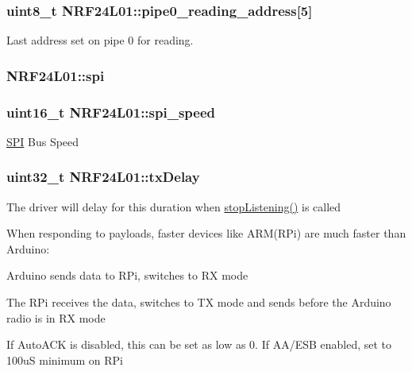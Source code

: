 \subsubsection[{\texorpdfstring{pipe0\+\_\+reading\+\_\+address}{pipe0_reading_address}}]{\setlength{\rightskip}{0pt plus 5cm}uint8\+\_\+t N\+R\+F24\+L01\+::pipe0\+\_\+reading\+\_\+address\mbox{[}5\mbox{]}\hspace{0.3cm}{\ttfamily [private]}}\hypertarget{classNRF24L01_af836ff0a915587aa40b5eabe4101ea4c}{}\label{classNRF24L01_af836ff0a915587aa40b5eabe4101ea4c}
Last address set on pipe 0 for reading. 
\subsubsection[{\texorpdfstring{spi}{spi}}]{ N\+R\+F24\+L01\+::spi}\hypertarget{classNRF24L01_a6321af25fee367445baa6ab4840f8443}{}\label{classNRF24L01_a6321af25fee367445baa6ab4840f8443}
\subsubsection[{\texorpdfstring{spi\+\_\+speed}{spi_speed}}]{\setlength{\rightskip}{0pt plus 5cm}uint16\+\_\+t N\+R\+F24\+L01\+::spi\+\_\+speed\hspace{0.3cm}{\ttfamily [private]}}\hypertarget{classNRF24L01_a4701641c1e8b3d082deb03f93c84d8c7}{}\label{classNRF24L01_a4701641c1e8b3d082deb03f93c84d8c7}
\hyperlink{classSPI}{S\+PI} Bus Speed 
\subsubsection[{\texorpdfstring{tx\+Delay}{txDelay}}]{\setlength{\rightskip}{0pt plus 5cm}uint32\+\_\+t N\+R\+F24\+L01\+::tx\+Delay}\hypertarget{classNRF24L01_a1feaab910ecff17805f8141fe40028e7}{}\label{classNRF24L01_a1feaab910ecff17805f8141fe40028e7}
The driver will delay for this duration when \hyperlink{classNRF24L01_a6ad13189b732f237ac148c659ddf6b01}{stop\+Listening()} is called

When responding to payloads, faster devices like A\+R\+M(\+R\+Pi) are much faster than Arduino\+:
\begin{DoxyEnumerate}
\item Arduino sends data to R\+Pi, switches to RX mode
\item The R\+Pi receives the data, switches to TX mode and sends before the Arduino radio is in RX mode
\item If Auto\+A\+CK is disabled, this can be set as low as 0. If A\+A/\+E\+SB enabled, set to 100uS minimum on R\+Pi
\end{DoxyEnumerate}

